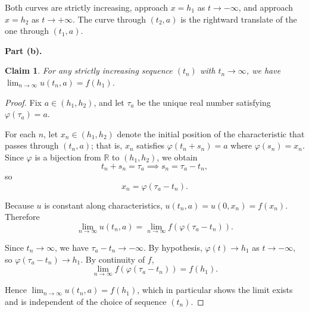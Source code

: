 \documentclass{amsart}
\newtheorem*{claim}{Claim}
\begin{document}
\begin{center}
\end{center}

Both curves are strictly increasing, approach $x = h_1$ as $t \to -\infty$, and approach $x = h_2$ as $t \to +\infty$. The curve through $(t_2, a)$ is the rightward translate of the one through $(t_1, a)$.

\medskip
\textbf{Part (b).}

\begin{claim}
  For any strictly increasing sequence $(t_n)$ with $t_n \to \infty$, we have $\displaystyle\lim_{n\to\infty} u(t_n, a) = f(h_1)$.
\end{claim}

\begin{proof}
  Fix $a \in (h_1, h_2)$, and let $\tau_a$ be the unique real number satisfying $\varphi(\tau_a) = a$.

  For each $n$, let $x_n \in (h_1, h_2)$ denote the initial position of the characteristic that passes through $(t_n, a)$; that is, $x_n$ satisfies $\varphi(t_n + s_n) = a$ where $\varphi(s_n) = x_n$. Since $\varphi$ is a bijection from $\mathbb{R}$ to $(h_1, h_2)$, we obtain
  \[
    t_n + s_n = \tau_a \implies s_n = \tau_a - t_n,
  \]
  so
  \[
    x_n = \varphi(\tau_a - t_n).
  \]

  Because $u$ is constant along characteristics, $u(t_n, a) = u(0, x_n) = f(x_n)$. Therefore
  \[
    \lim_{n \to \infty} u(t_n, a) = \lim_{n \to \infty} f\!\left(\varphi(\tau_a - t_n)\right).
  \]

  Since $t_n \to \infty$, we have $\tau_a - t_n \to -\infty$. By hypothesis, $\varphi(t) \to h_1$ as $t \to -\infty$, so $\varphi(\tau_a - t_n) \to h_1$. By continuity of $f$,
  \[
    \lim_{n \to \infty} f\!\left(\varphi(\tau_a - t_n)\right) = f(h_1).
  \]

  Hence $\lim_{n\to\infty} u(t_n, a) = f(h_1)$, which in particular shows the limit exists and is independent of the choice of sequence $(t_n)$.
\end{proof}
\end{document}
